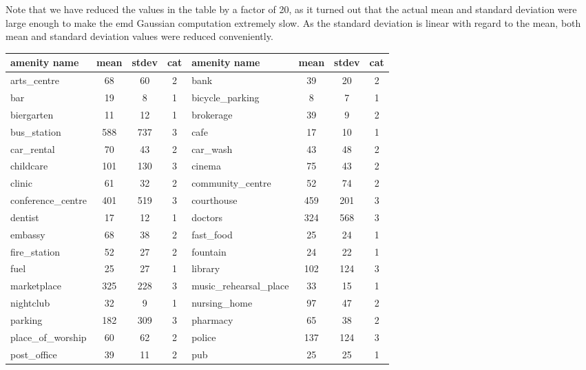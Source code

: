 Note that we have reduced the values in the table by a factor of 20, as it turned out that the actual mean and standard deviation were large enough to make the emd Gaussian computation extremely slow. As the standard deviation is linear with regard to the mean, both mean and standard deviation values were reduced conveniently. 

\begin{table}[!ht]
	{\begin{tabular}{ | l | c | c | c || l | c | c | c |}
			\hline		
			\textbf{amenity name} & \textbf{mean} & \textbf{stdev} & \textbf{cat} & \textbf{amenity name} & \textbf{mean} & \textbf{stdev} & \textbf{cat} \\ \hline
			arts\_centre & 68 & 60 & 2 & bank & 39 & 20 & 2 \\ \hline
			bar & 19 & 8 & 1 & bicycle\_parking & 8 & 7 & 1 \\ \hline
			biergarten & 11 & 12 & 1 & brokerage & 39 & 9 & 2 \\ \hline
			bus\_station & 588 & 737 & 3 & cafe & 17 & 10 & 1 \\ \hline
			car\_rental & 70 & 43 & 2 & car\_wash & 43 & 48 & 2 \\ \hline
			childcare & 101 & 130 & 3 & cinema & 75 & 43 & 2 \\ \hline
			clinic & 61 & 32 & 2 & community\_centre & 52 & 74 & 2 \\ \hline
			conference\_centre & 401 & 519 & 3 & courthouse & 459 & 201 & 3 \\ \hline
			dentist & 17 & 12 & 1 & doctors & 324 & 568 & 3 \\ \hline
			embassy & 68 & 38 & 2 & fast\_food & 25 & 24 & 1 \\ \hline
			fire\_station & 52 & 27 & 2 & fountain & 24 & 22 & 1 \\ \hline
			fuel & 25 & 27 & 1 & library & 102 & 124 & 3 \\ \hline
			marketplace & 325 & 228 & 3 & music\_rehearsal\_place & 33 & 15 & 1 \\ \hline
			nightclub & 32 & 9 & 1 & nursing\_home & 97 & 47 & 2 \\ \hline
			parking & 182 & 309 & 3 & pharmacy & 65 & 38 & 2 \\ \hline
			place\_of\_worship & 60 & 62 & 2 & police & 137 & 124 & 3 \\ \hline
			post\_office & 39 & 11 & 2 & pub & 25 & 25 & 1 \\ \hline

\end{tabular}}
\end{table}
